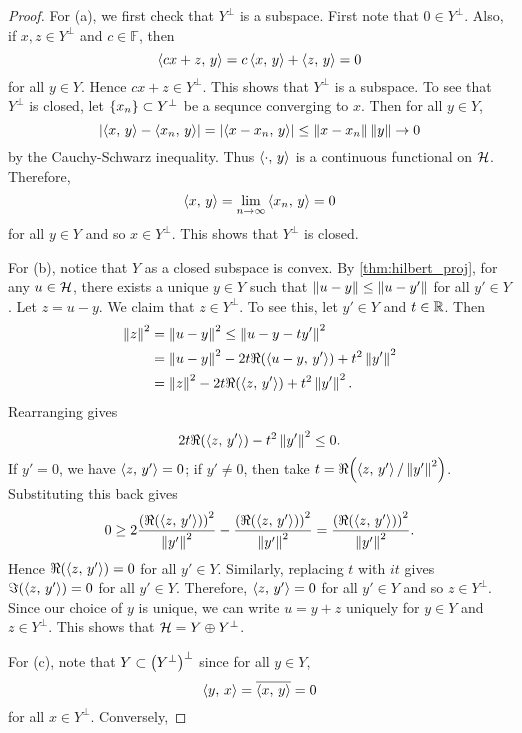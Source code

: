 \begin{proof}
    For (a), we first check that $Y^\perp$ is a subspace. First note that 
    $0\in Y^\perp$. Also, if $x,z\in Y^\perp$ and $c\in\mathbb{F}$, then 
    \begin{equation*}
        \left\langle {cx+z},\, {y} \right\rangle = c\left\langle {x},\, {y} \right\rangle + \left\langle {z},\, {y} \right\rangle = 0
    \end{equation*}
    for all $y\in Y$. Hence $cx+z\in Y^\perp$. This shows that $Y^\perp$ is a 
    subspace. To see that $Y^\perp$ is closed, let $\left\{ {x_n} \right\}\subset Y^\perp$ 
    be a sequnce converging to $x$. Then for all $y\in Y$, 
    \begin{equation*}
        \left\lvert {\left\langle {x},\, {y} \right\rangle - \left\langle {x_n},\, {y} \right\rangle} \right\rvert = \left\lvert {\left\langle {x-x_n},\, {y} \right\rangle} \right\rvert 
        \leq \left\lVert {x-x_n} \right\rVert\left\lVert {y} \right\rVert \to 0
    \end{equation*}
    by the Cauchy-Schwarz inequality. Thus $\left\langle {\cdot},\, {y} \right\rangle$ is a continuous 
    functional on $\mathcal{H}$. Therefore,
    \begin{equation*}
        \left\langle {x},\, {y} \right\rangle = \lim_{n\to\infty}\left\langle {x_n},\, {y} \right\rangle = 0
    \end{equation*}
    for all $y\in Y$ and so $x\in Y^\perp$. This shows that $Y^\perp$ is closed. 

    For (b), notice that $Y$ as a closed subspace is convex. By 
    \cref{thm:hilbert_proj}, for any $u\in\mathcal{H}$, there exists a unique 
    $y\in Y$ such that $\left\lVert {u-y} \right\rVert\leq \left\lVert {u-y'} \right\rVert$ for all $y'\in Y$. 
    Let $z = u-y$. We claim that $z\in Y^\perp$. To see this, let $y'\in Y$ 
    and $t\in\mathbb{R}$. Then 
    \begin{equation*}
        \begin{split}
            \norm{z}^2 &= \norm{u-y}^2 \leq \norm{u-y-ty'}^2 \\
            &= \norm{u-y}^2 - 2t\Re\pth{\inprod{u-y}{y'}} + t^2\norm{y'}^2 \\
            &= \norm{z}^2 - 2t\Re\pth{\inprod{z}{y'}} + t^2\norm{y'}^2.
        \end{split}
    \end{equation*} 
    Rearranging gives
    \begin{equation*}
        2t\Re\pth{\inprod{z}{y'}} - t^2\norm{y'}^2 \leq 0.
    \end{equation*}
    If $y' = 0$, we have $\left\langle {z},\, {y'} \right\rangle = 0$; if $y'\neq 0$, then take 
    $t = \Re\pth{\inprod{z}{y'}/\norm{y'}^2}$. Substituting this back gives
    \begin{equation*}
        0 \geq 2\frac{\pth{\Re\pth{\inprod{z}{y'}}}^2}{\norm{y'}^2} - \frac{\pth{\Re\pth{\inprod{z}{y'}}}^2}{\norm{y'}^2}
        = \frac{\pth{\Re\pth{\inprod{z}{y'}}}^2}{\norm{y'}^2}.
    \end{equation*}
    Hence $\Re\pth{\inprod{z}{y'}} = 0$ for all $y'\in Y$. Similarly, replacing 
    $t$ with $it$ gives $\Im\pth{\inprod{z}{y'}} = 0$ for all $y'\in Y$. 
    Therefore, $\left\langle {z},\, {y'} \right\rangle = 0$ for all $y'\in Y$ and so $z\in Y^\perp$. 
    Since our choice of $y$ is unique, we can write $u = y + z$ uniquely for 
    $y\in Y$ and $z\in Y^\perp$. This shows that $\mathcal{H} = Y\oplus Y^\perp$. 

    For (c), note that $Y\subset\pth{Y^\perp}^\perp$ since for all $y\in Y$, 
    \begin{equation*}
        \left\langle {y},\, {x} \right\rangle = \overline{\left\langle {x},\, {y} \right\rangle} = 0
    \end{equation*}
    for all $x\in Y^\perp$. Conversely, 
\end{proof}